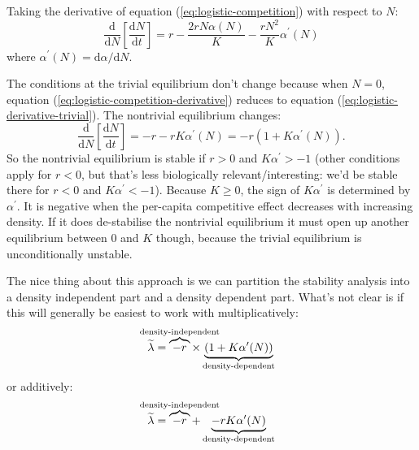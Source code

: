 \documentclass[12pt,a4paper]{article}
\newcommand{\ud}{\mathrm{d}}
\begin{document}
Taking the derivative of equation (\ref{eq:logistic-competition}) with
respect to $N$:
\begin{equation}
  \label{eq:logistic-competition-derivative}
  \frac{\ud}{\ud N}\left[\frac{\ud N}{\ud t}\right]
   = r - \frac{2 r N\alpha(N)}{K} - \frac{rN^2}{K}\alpha^\prime(N)
\end{equation}
where $\alpha^\prime(N) = \ud \alpha/\ud N$.

The conditions at the trivial equilibrium don't change because when $N
= 0$, equation (\ref{eq:logistic-competition-derivative}) reduces to
equation (\ref{eq:logistic-derivative-trivial}).  The nontrivial
equilibrium changes:
\begin{equation}
  \label{eq:logistic-competition-derivative-nontrivial}
  \frac{\ud}{\ud N}\left[\frac{\ud N}{\ud t}\right]
   = -r - rK\alpha^\prime(N) = -r(1 + K\alpha^\prime(N)).
\end{equation}
So the nontrivial equilibrium is stable if $r > 0$ and $K\alpha^\prime
> -1$ (other conditions apply for $r < 0$, but that's less
biologically relevant/interesting: we'd be stable there for $r < 0$
and $K\alpha^\prime < -1$).  Because $K \geq 0$, the sign of
$K\alpha^\prime$ is determined by $\alpha^\prime$.  It is negative
when the per-capita competitive effect decreases with increasing
density.  If it does de-stabilise the nontrivial equilibrium it must
open up another equilibrium between 0 and $K$ though, because the
trivial equilibrium is unconditionally unstable.

The nice thing about this approach is we can partition the stability
analysis into a density independent part and a density dependent
part.  What's not clear is if this will generally be easiest to work
with multiplicatively:
\begin{equation}
  \label{eq:logistic-comptition-partition-multiplicative}
  \widetilde \lambda =
  \overbrace{-r}^{\mathclap{\text{density-independent}}}
  \times
  \underbrace{(1 + K\alpha^\prime(N))}_{\text{density-dependent}}
\end{equation}
or additively:
\begin{equation}
  \label{eq:logistic-comptition-partition-multiplicative}
  \widetilde \lambda =
  \overbrace{-r}^{\mathclap{\text{density-independent}}}
  +
  \underbrace{-rK\alpha^\prime(N)}_{\text{density-dependent}}
\end{equation}
\end{document}
